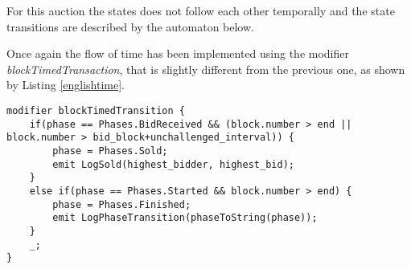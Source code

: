 \documentclass{article}
\begin{document}
For this auction the states does not follow each other temporally and the state transitions are described by the automaton below.
\begin{center}
\end{center}

Once again the flow of time has been implemented using the modifier \textit{blockTimedTransaction}, that is slightly different from the previous one, as shown by Listing \ref{englishtime}.

\begin{lstlisting}[language=Solidity, caption={Modifier used for modelling the time flow during an English auction, according to the automata.},captionpos=b, label=englishtime]
 modifier blockTimedTransition {
    if(phase == Phases.BidReceived && (block.number > end || block.number > bid_block+unchallenged_interval)) {
        phase = Phases.Sold; 
        emit LogSold(highest_bidder, highest_bid);
    }
    else if(phase == Phases.Started && block.number > end) {
        phase = Phases.Finished;
        emit LogPhaseTransition(phaseToString(phase));
    }
    _;
}
\end{lstlisting}
\end{document}

